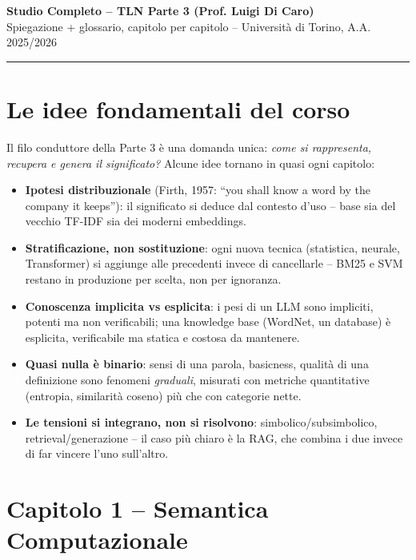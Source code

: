 \documentclass[11pt,a4paper]{article}
\begin{document}
\begin{center}
{\Large\textbf{Studio Completo -- TLN Parte 3 (Prof. Luigi Di Caro)}}\\[2pt]
{\small Spiegazione + glossario, capitolo per capitolo -- Universit\`a di Torino, A.A. 2025/2026}
\end{center}
\vspace{2pt}
\hrule
\vspace{6pt}

\section*{Le idee fondamentali del corso}

Il filo conduttore della Parte 3 \`e una domanda unica: \emph{come si rappresenta, recupera e genera il significato?} Alcune idee tornano in quasi ogni capitolo:

\begin{itemize}
\item \textbf{Ipotesi distribuzionale} (Firth, 1957: ``you shall know a word by the company it keeps''): il significato si deduce dal contesto d'uso -- base sia del vecchio TF-IDF sia dei moderni embeddings.
\item \textbf{Stratificazione, non sostituzione}: ogni nuova tecnica (statistica, neurale, Transformer) si aggiunge alle precedenti invece di cancellarle -- BM25 e SVM restano in produzione per scelta, non per ignoranza.
\item \textbf{Conoscenza implicita vs esplicita}: i pesi di un LLM sono impliciti, potenti ma non verificabili; una knowledge base (WordNet, un database) \`e esplicita, verificabile ma statica e costosa da mantenere.
\item \textbf{Quasi nulla \`e binario}: sensi di una parola, basicness, qualit\`a di una definizione sono fenomeni \emph{graduali}, misurati con metriche quantitative (entropia, similarit\`a coseno) pi\`u che con categorie nette.
\item \textbf{Le tensioni si integrano, non si risolvono}: simbolico/subsimbolico, retrieval/generazione -- il caso pi\`u chiaro \`e la RAG, che combina i due invece di far vincere l'uno sull'altro.
\end{itemize}

\section*{Capitolo 1 -- Semantica Computazionale}
\end{document}
